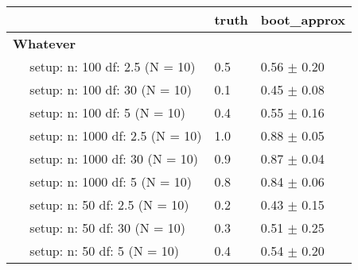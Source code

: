 \documentclass{article}
\begin{document}
\begin{tabular}{l|l|l}
    \hline
     & truth & boot_approx\\
    \hline
    \bf{Whatever} & ~ & ~\\
    \hline
    ~~ setup: n: 100 df: 2.5 (N = 10) & 0.5 & 0.56 $\pm$ 0.20\\
    \hline
    ~~ setup: n: 100 df: 30 (N = 10) & 0.1 & 0.45 $\pm$ 0.08\\
    \hline
    ~~ setup: n: 100 df: 5 (N = 10) & 0.4 & 0.55 $\pm$ 0.16\\
    \hline
    ~~ setup: n: 1000 df: 2.5 (N = 10) & 1.0 & 0.88 $\pm$ 0.05\\
    \hline
    ~~ setup: n: 1000 df: 30 (N = 10) & 0.9 & 0.87 $\pm$ 0.04\\
    \hline
    ~~ setup: n: 1000 df: 5 (N = 10) & 0.8 & 0.84 $\pm$ 0.06\\
    \hline
    ~~ setup: n: 50 df: 2.5 (N = 10) & 0.2 & 0.43 $\pm$ 0.15\\
    \hline
    ~~ setup: n: 50 df: 30 (N = 10) & 0.3 & 0.51 $\pm$ 0.25\\
    \hline
    ~~ setup: n: 50 df: 5 (N = 10) & 0.4 & 0.54 $\pm$ 0.20\\
    \hline
    \end{tabular}
\end{document}
